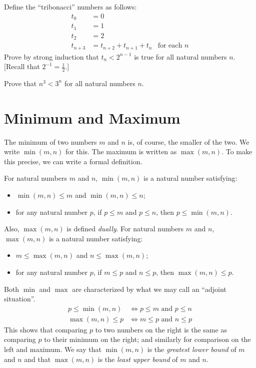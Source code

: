 \begin{exer}
	\begin{exercise}
		\item Define the ``tribonacci'' numbers as follows:
		\begin{align*}
			t_0 &= 0\\
			t_1 &= 1\\
			t_2 &= 2\\
			t_{n+3}& = t_{n+2} + t_{n+1} + t_n & \text{for each $n$} 
		\end{align*}
		Prove by strong induction that $t_n < 2^{n-1}$ is true for all natural numbers $n$. [Recall that $2^{-1} = \frac{1}{2}$.]
		\item Prove that $n^3<3^n$ for all natural numbers $n$.
	\end{exercise}
\end{exer}

\section{Minimum and Maximum}

The minimum of two numbers $m$ and $n$ is, of course, the smaller of the two. 
We write $\min(m,n)$ for this. The maximum is written as $\max(m,n)$. To make this
precise, we can write a formal definition.

\begin{defn}
  For natural numbers $m$ and $n$, $\min(m,n)$ is a natural number satisfying:
  \begin{itemize}
  \item $\min(m,n)\leq m$ and $\min(m,n)\leq n$;
  \item for any natural number $p$, if $p\leq m$ and $p\leq n$, then $p\leq \min(m,n)$.
  \end{itemize}

Also, $\max(m,n)$ is defined \emph{dually}. For natural numbers $m$ and $n$, $\max(m,n)$ is a natural number satisfying:
\begin{itemize}
	\item $m\leq \max(m,n)$ and $n\leq \max(m,n)$;
	\item for any natural number $p$, if $m\leq p$ and $n\leq p$, then $\max(m,n)\leq p$.
\end{itemize}
\end{defn}


Both $\min$ and $\max$ are characterized by what we may call an ``adjoint situation''.
\begin{align*}
  p\leq \min(m,n) &\iff \text{$p\leq m$ and $p\leq n$}\\
  \max(m,n) \leq p&\iff \text{$m\leq p$ and $n\leq p$}
\end{align*}
This shows that comparing $p$ to two numbers on the right is the same as comparing $p$ to their minimum on the right; and similarly for comparison on the left and maximum.
We say that $\min(m,n)$ is the \emph{greatest lower bound} of $m$ and $n$ and that $\max(m,n)$ is the \emph{least upper bound} of $m$ and $n$. 

